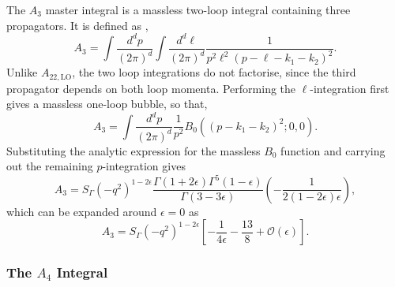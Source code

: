 The $A_3$ master integral is a massless two-loop integral containing three propagators. It is defined
as \cite{Gehrmann-DeRidder:2005btv},
\begin{equation}
    A_3 = \int \frac{d^dp}{(2\pi)^d}\int\frac{d^d\ell}{(2\pi)^d}\frac1{p^2\ell^2(p-\ell-k_1-k_2)^2}.
\end{equation}
Unlike $A_{22,\mathrm{LO}}$, the two loop integrations do not factorise, since the third propagator
depends on both loop momenta. Performing the $\ell$-integration first gives a massless one-loop
bubble, so that,
\begin{equation}
    A_3 = \int \frac{d^dp}{(2\pi)^d}\frac1{p^2}B_0\!\left((p-k_1-k_2)^2;0,0\right).
\end{equation}
Substituting the analytic expression for the massless $B_0$ function and carrying out the remaining
$p$-integration gives
\begin{equation}
    A_3 = S_\Gamma\!\left(-q^2\right)^{1-2\epsilon}\frac{\Gamma(1+2\epsilon)\Gamma^5(1-\epsilon)}{\Gamma(3-3\epsilon)}\!\left(-\frac{1}{2(1-2\epsilon)\epsilon}\right),
\end{equation}
which can be expanded around $\epsilon=0$ as
\begin{equation}
    A_3 = S_\Gamma\!\left(-q^2\right)^{1-2\epsilon}\!\left[-\frac1{4\epsilon}-\frac{13}8+\mathcal O(\epsilon)\right].
\end{equation}

\subsubsection*{The $A_4$ Integral}

